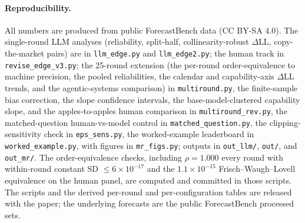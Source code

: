 \documentclass[11pt]{article}
\begin{document}
\paragraph{Reproducibility.} {\sloppy All numbers are produced from public ForecastBench data (CC BY-SA 4.0). The single-round LLM analyses (reliability, split-half, collinearity-robust $\Delta$LL, copy-the-market pairs) are in \texttt{llm\_edge.py} and \texttt{llm\_edge2.py}; the human track in \texttt{revise\_edge\_v3.py}; the 25-round extension (the per-round order-equivalence to machine precision, the pooled reliabilities, the calendar and capability-axis $\Delta$LL trends, and the agentic-systems comparison) in \texttt{multiround.py}, the finite-sample bias correction, the slope confidence intervals, the base-model-clustered capability slope, and the apples-to-apples human comparison in \texttt{multiround\_rev.py}, the matched-question human-vs-model control in \texttt{matched\_question.py}, the clipping-sensitivity check in \texttt{eps\_sens.py}, the worked-example leaderboard in \texttt{worked\_example.py}, with figures in \texttt{mr\_figs.py}; outputs in \texttt{out\_llm/}, \texttt{out/}, and \texttt{out\_mr/}. The order-equivalence checks, including $\rho=1.000$ every round with within-round constant SD $\le 6\times10^{-17}$ and the $1.1\times10^{-15}$ Frisch--Waugh--Lovell equivalence on the human panel, are computed and committed in those scripts. The scripts and the derived per-round and per-configuration tables are released with the paper; the underlying forecasts are the public ForecastBench processed sets.\par}
\end{document}
